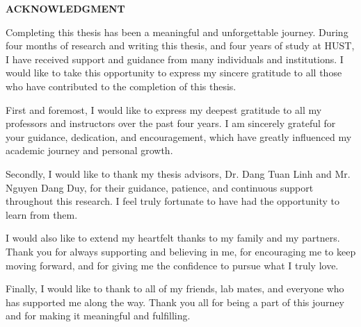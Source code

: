 \documentclass[../main.tex]{subfiles}
\begin{document}
\begin{center}
    \Large{\textbf{ACKNOWLEDGMENT}}\\
\end{center}
\vspace{1cm}
Completing this thesis has been a meaningful and unforgettable journey. During four months of research and writing this thesis, and four years of study at HUST, I have received support and guidance from many individuals and institutions. I would like to take this opportunity to express my sincere gratitude to all those who have contributed to the completion of this thesis.

First and foremost, I would like to express my deepest gratitude to all my professors and instructors over the past four years. I am sincerely grateful for your guidance, dedication, and encouragement, which have greatly influenced my academic journey and personal growth. 

Secondly, I would like to thank my thesis advisors, Dr. Dang Tuan Linh and Mr. Nguyen Dang Duy, for their guidance, patience, and continuous support throughout this research. I feel truly fortunate to have had the opportunity to learn from them.

I would also like to extend my heartfelt thanks to my family and my partners. Thank you for always supporting and believing in me, for encouraging me to keep moving forward, and for giving me the confidence to pursue what I truly love.

Finally, I would like to thank to all of my friends, lab mates, and everyone who has supported me along the way. Thank you all for being a part of this journey and for making it meaningful and fulfilling.
\end{document}
